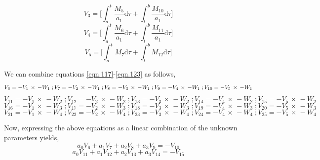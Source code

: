 \documentclass[letterpaper%
, twoside%
, 12pt%
,memoire%
, english%
,creativecommons,hyperref%
]{thETS}
\begin{document}
\begin{equation}\label{eqn.122}
V_{3} = \bigg[\int_{a}^{t}\frac{M_{5}}{a_{1}} \mathrm{d}\tau + \int_{t}^{b}\frac{M_{10}}{a_{1}} \mathrm{d}\tau \bigg]
\end{equation}
\begin{equation}\label{eqn.122.5}
V_{4} = \bigg[\int_{a}^{t}\frac{M_{6}}{a_{1}} \mathrm{d}\tau + \int_{t}^{b}\frac{M_{11}}{a_{1}} \mathrm{d}\tau \bigg]
\end{equation}
\begin{equation}\label{eqn.123}
V_{5} = \bigg[\int_{a}^{t} M_{7} \mathrm{d}\tau + \int_{t}^{b} M_{12} \mathrm{d}\tau \bigg]
\end{equation}

We can combine equations \eqref{eqn.117}-\eqref{eqn.123} as follows,
\begin{equation}\label{eqn.124}
V_{6} = -V_{1}\, \times \,-W_{1}\;; V_{7} = -V_{2}\, \times \,-W_{1}\;; V_{8} = -V_{3}\, \times \,-W_{1}\;;\\ V_{9} = -V_{4}\, \times \,-W_{1}\;; V_{10} = -V_{5}\, \times \,-W_{1}
\end{equation}
\begin{equation}\label{eqn.125}
V_{11} = -V_{1}\, \times \,-W_{2}\;; V_{12} = -V_{2}\, \times \,-W_{2}\;; V_{13} = -V_{3}\, \times \,-W_{2}\;; V_{14} = -V_{4}\, \times \,-W_{2}\;; V_{15} = -V_{5}\, \times \,-W_{2}
\end{equation}
\begin{equation}\label{eqn.126}
V_{16} = -V_{1}\, \times \,-W_{3}\;; V_{17} = -V_{2}\, \times \,-W_{3}\;; V_{18} = -V_{3}\, \times \,-W_{3}\;; V_{19} = -V_{4}\, \times \,-W_{3}\;; V_{20} = -V_{5}\, \times \,-W_{3}
\end{equation}
\begin{equation}\label{eqn.126.5}
V_{21} = -V_{1}\, \times \,-W_{4}\;; V_{22} = -V_{2}\, \times \,-W_{4}\;; V_{23} = -V_{3}\, \times \,-W_{4}\;; V_{24} = -V_{4}\, \times \,-W_{4}\;; V_{25} = -V_{5}\, \times \,-W_{4}
\end{equation}
\par Now, expressing the above equations as a linear combination of the unknown parameters yields,
\begin{equation}\label{eqn.127}
a_{0} V_{6} + a_{1}V_{7} + a_{2}V_{8} + a_{3}V_{9} = -V_{10}
\end{equation}
\begin{equation}\label{eqn.128}
a_{0} V_{11} + a_{1}V_{12} + a_{2}V_{13} + a_{3}V_{14} = -V_{15}
\end{equation}
\end{document}
